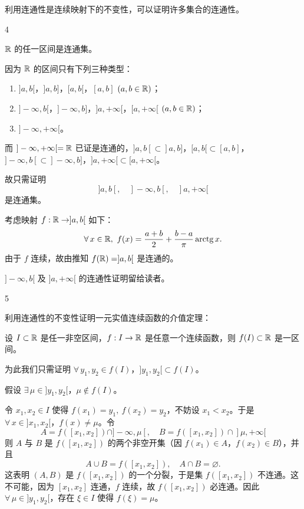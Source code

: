 利用连通性是连续映射下的不变性，可以证明许多集合的连通性。

\begin{sourceexample}{4}

$\mathbb{R}$ 的任一区间是连通集。

因为 $\mathbb{R}$ 的区间只有下列三种类型：
\begin{enumerate}[label=$n^{\circ}$.,leftmargin=2.2em]
\item $]a,b[$，$]a,b]$，$[a,b[$，$[a,b]$ $(a,b\in\mathbb{R})$；
\item $]-\infty,b[$，$]-\infty,b]$，$]a,+\infty[$，$[a,+\infty[$ $(a,b\in\mathbb{R})$；
\item $]-\infty,+\infty[$。
\end{enumerate}
而 $]-\infty,+\infty[=\mathbb{R}$ 已证是连通的，$]a,b[\subset]a,b]$，$[a,b[\subset[a,b]$，$]-\infty,b[\subset]-\infty,b]$，$]a,+\infty[\subset[a,+\infty[$。

故只需证明
\[]a,b[,\quad]-\infty,b[,\quad]a,+\infty[\]
是连通集。

考虑映射 $f:\mathbb{R}\to]a,b[$ 如下：
\[\forall\,x\in\R,\ f(x)=\frac{a+b}{2}+\frac{b-a}{\pi}\operatorname{arctg}x.\]
由于 $f$ 连续，故由推知 $f(\mathbb{R})=]a,b[$ 是连通的。

$]-\infty,b[$ 及 $]a,+\infty[$ 的连通性证明留给读者。

\end{sourceexample}

\begin{sourceexample}{5}

利用连通性的不变性证明一元实值连续函数的介值定理：

设 $I\subset\mathbb{R}$ 是任一非空区间，$f:I\to\mathbb{R}$ 是任意一个连续函数，则 $f(I)\subset\mathbb{R}$ 是一区间。

为此我们只需证明 $\forall\,y_1,y_2\in f(I)$，$]y_1,y_2[\subset f(I)$。

假设 $\exists\,\mu\in]y_1,y_2[$，$\mu\notin f(I)$。

令 $x_1,x_2\in I$ 使得 $f(x_1)=y_1,\ f(x_2)=y_2$，不妨设 $x_1<x_2$。于是 $\forall\,x\in]x_1,x_2[$，$f(x)\neq\mu$。令
\[A=f([x_1,x_2])\cap]-\infty,\mu[,\quad B=f([x_1,x_2])\cap]\mu,+\infty[\]
则 $A$ 与 $B$ 是 $f([x_1,x_2])$ 的两个非空开集（因 $f(x_1)\in A$，$f(x_2)\in B$），并且
\[A\cup B=f([x_1,x_2]),\quad A\cap B=\varnothing.\]
这表明 $(A,B)$ 是 $f([x_1,x_2])$ 的一个分裂，于是集 $f([x_1,x_2])$ 不连通。这不可能，因为 $[x_1,x_2]$ 连通，$f$ 连续，故 $f([x_1,x_2])$ 必连通。因此 $\forall\,\mu\in]y_1,y_2[$，存在 $\xi\in I$ 使得 $f(\xi)=\mu$。

\end{sourceexample}

